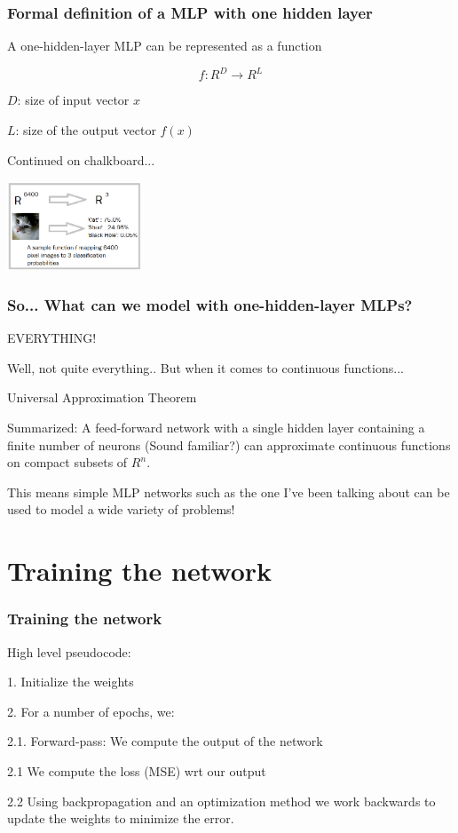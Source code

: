 \documentclass{beamer}
\begin{document}
\begin{frame}  
    \frametitle{Formal definition of a MLP with one hidden layer}
    \begin{block}{A one-hidden-layer MLP can be represented as a function}
        \item$$f: R^D \rightarrow R^L$$
        \item $D$: size of input vector $x$
        \item $L$: size of the output vector $f(x)$
        \item Continued on chalkboard...
        \end{block}
    \includegraphics[width=4cm]{sample_f.png}
\end{frame}
\begin{frame}
    \frametitle{So... What can we model with one-hidden-layer MLPs?}
    \begin{block}{EVERYTHING!}
    \item Well, not quite everything.. But when it comes to continuous functions...
    \item Universal Approximation Theorem
    \item Summarized: A feed-forward network with a single hidden layer containing a finite number of neurons (Sound familiar?) can approximate continuous functions on compact subsets of $R^n$. 
    \item This means simple MLP networks such as the one I've been talking about can be used to model a wide variety of problems!
    \end{block}
\end{frame}
\section{Training the network}
\begin{frame}
    \frametitle{Training the network}
    \begin{block}{High level pseudocode:}
        \item 1. Initialize the weights 
        \item 2. For a number of epochs, we:
        \item 2.1. Forward-pass: We compute the output of the network
        \item 2.1 We compute the loss (MSE) wrt our output
        \item 2.2 Using backpropagation and an optimization method we work backwards to update the weights to minimize the error. 
    \end{block}   
\end{frame}
\end{document}
